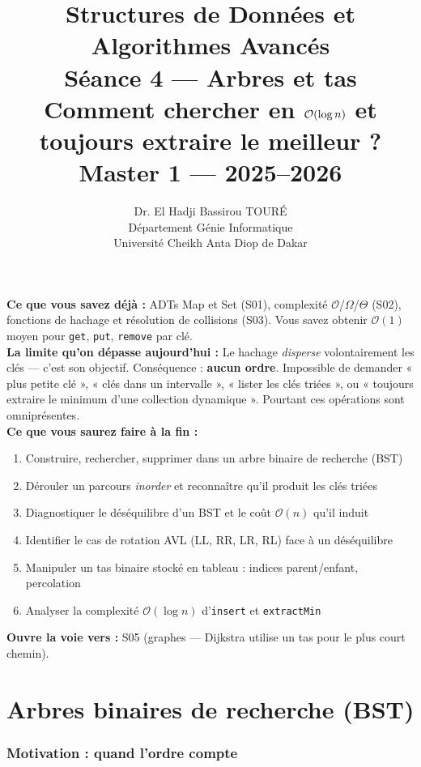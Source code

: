 \documentclass[11pt,a4paper]{article}
\title{%
\vspace{-1cm}
\textbf{\LARGE Structures de Données et}\\
\textbf{\LARGE Algorithmes Avancés}\\[0.8cm]
\textbf{\huge Séance 4 --- Arbres et tas}\\[0.3cm]
\textbf{\Large Comment chercher en $\bigO(\log n)$ et toujours extraire le meilleur ?}\\[0.5cm]
\large Master 1 --- 2025--2026}
\author{Dr. El Hadji Bassirou TOURÉ\\
Département Génie Informatique\\
Université Cheikh Anta Diop de Dakar}
\date{}
\newcommand{\bigO}{\mathcal{O}}
\begin{document}
\maketitle
\thispagestyle{empty}

\begin{prereqbox}
\textbf{Ce que vous savez déjà :} ADTs Map et Set (S01), complexité $\bigO$/$\Omega$/$\Theta$ (S02), fonctions de hachage et résolution de collisions (S03). Vous savez obtenir $\bigO(1)$ moyen pour \texttt{get}, \texttt{put}, \texttt{remove} par clé.\\[4pt]
\textbf{La limite qu'on dépasse aujourd'hui :} Le hachage \emph{disperse} volontairement les clés --- c'est son objectif. Conséquence : \textbf{aucun ordre}. Impossible de demander « plus petite clé », « clés dans un intervalle », « lister les clés triées », ou « toujours extraire le minimum d'une collection dynamique ». Pourtant ces opérations sont omniprésentes.\\[4pt]
\textbf{Ce que vous saurez faire à la fin :}
\begin{enumerate}[nosep]
    \item Construire, rechercher, supprimer dans un arbre binaire de recherche (BST)
    \item Dérouler un parcours \emph{inorder} et reconnaître qu'il produit les clés triées
    \item Diagnostiquer le déséquilibre d'un BST et le coût $\bigO(n)$ qu'il induit
    \item Identifier le cas de rotation AVL (LL, RR, LR, RL) face à un déséquilibre
    \item Manipuler un tas binaire stocké en tableau : indices parent/enfant, percolation
    \item Analyser la complexité $\bigO(\log n)$ d'\texttt{insert} et \texttt{extractMin}
\end{enumerate}
\textbf{Ouvre la voie vers :} S05 (graphes --- Dijkstra utilise un tas pour le plus court chemin).
\end{prereqbox}

\tableofcontents
\newpage

\part{Arbres binaires de recherche (BST)}

\section{Motivation : quand l'ordre compte}
\end{document}
